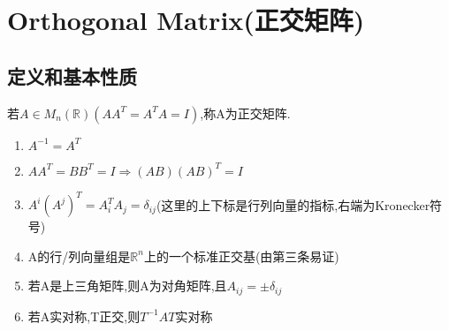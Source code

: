 \documentclass[UTF8,a4paper,notitlepage]{book}
\begin{document}
        \newpage
        \section{Orthogonal Matrix(正交矩阵)}
        \subsection{定义和基本性质}
        \begin{definition}
            若$A\in M_n(\mathbb{R})(AA^T=A^TA=I)$,称A为正交矩阵.
        \end{definition}
        \begin{corollary}[正交矩阵的基本性质]
            \begin{enumerate}
                \item $A^{-1}=A^T$
                \item $AA^T=BB^T=I\Rightarrow (AB)(AB)^T=I$
                \item $A^i(A^j)^T=A_i^TA_j=\delta_{ij}$(这里的上下标是行列向量的指标,右端为Kronecker符号)
                \item A的行/列向量组是$\mathbb{R}^n$上的一个标准正交基(由第三条易证)
                \item 若A是上三角矩阵,则A为对角矩阵,且$A_{ij}=\pm \delta_{ij}$
                \item 若A实对称,T正交,则$T^{-1}AT$实对称
            \end{enumerate}
        \end{corollary}
\end{document}
